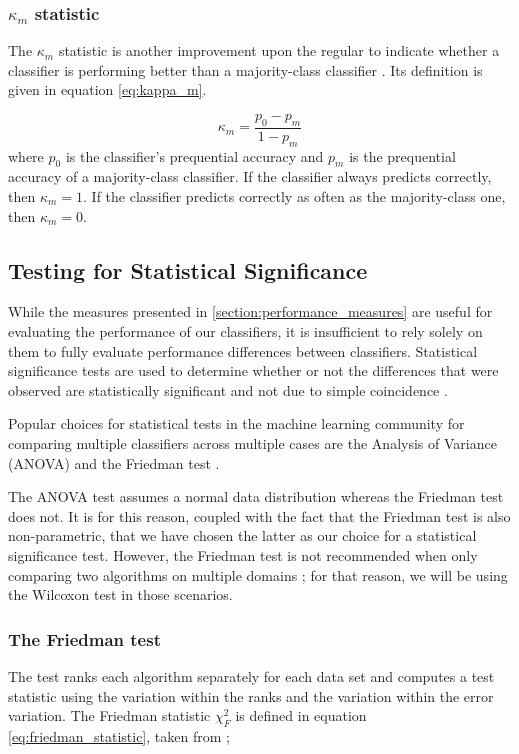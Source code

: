 \subsubsection{$\kappa_m$ statistic}
The $\kappa_m$ statistic is another improvement upon the regular to indicate whether a classifier is performing better than a majority-class classifier \cite{bifet2015efficient}. Its definition is given in equation \ref{eq:kappa_m}.

\begin{equation}
    \label{eq:kappa_m}
    \kappa_m = \frac{p_0-p_m}{1-p_m}
\end{equation}where $p_0$ is the classifier's prequential accuracy and $p_m$ is the prequential accuracy of a majority-class classifier. If the classifier always predicts correctly, then $\kappa_m=1$. If the classifier predicts correctly as often as the majority-class one, then $\kappa_m=0$.

\subsection{Testing for Statistical Significance}
While the measures presented in \ref{section:performance_measures} are useful for evaluating the performance of our classifiers, it is insufficient to rely solely on them to fully evaluate performance differences between classifiers. Statistical significance tests are used to determine whether or not the differences that were observed are statistically significant and not due to simple coincidence \cite{japkowicz2011evaluating}.

Popular choices for statistical tests in the machine learning community for comparing multiple classifiers across multiple cases are the Analysis of Variance (ANOVA) \cite{fisher1956statistical} and the Friedman test \cite{friedman1937use}. 

The ANOVA test assumes a normal data distribution whereas the Friedman test does not. It is for this reason, coupled with the fact that the Friedman test is also non-parametric, that we have chosen the latter as our choice for a statistical significance test. However, the Friedman test is not recommended when only comparing two algorithms on multiple domains \cite[355]{flach2012ml}; for that reason, we will be using the Wilcoxon test \cite{wilcoxon1945individual} in those scenarios.

\subsubsection{The Friedman test}
The test ranks each algorithm separately for each data set and computes a test statistic using the variation within the ranks and the variation within the error variation. The Friedman statistic $\chi^2_F$ is defined in equation \ref{eq:friedman_statistic}, taken from \cite{japkowicz2011evaluating};

